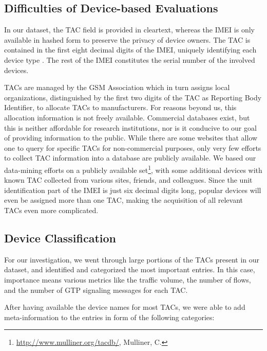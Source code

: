 \subsection{Difficulties of Device-based Evaluations}

In our dataset, the \ac{TAC} field is provided in clear\-text, whereas the \ac{IMEI} is only available in hashed form to preserve the privacy of device owners. The \ac{TAC} is contained in the first eight decimal digits of the \ac{IMEI}, uniquely identifying each device type \cite{3gpp23.003}. The rest of the \ac{IMEI} constitutes the serial number of the involved devices.

\acp{TAC} are managed by the GSM Association which in turn assigns local organizations, distinguished by the first two digits of the \ac{TAC} as Reporting Body Identifier, to allocate \acp{TAC} to manufacturers. For reasons beyond us, this allocation information is not freely available. Commercial databases exist, but this is neither affordable for research institutions, nor is it conducive to our goal of providing information to the public. While there are some websites that allow one to query for specific \acp{TAC} for non-commercial purposes, only very few efforts to collect \ac{TAC} information into a database are publicly available. We based our data-mining efforts on a publicly available set\footnote{\url{http://www.mulliner.org/tacdb/}, Mulliner, C.}, with some additional devices with known \ac{TAC} collected from various sites, friends, and colleagues. Since the unit identification part of the \ac{IMEI} is just six decimal digits long, popular devices will even be assigned more than one TAC, making the acquisition of all relevant \acp{TAC} even more complicated.



\subsection{Device Classification}

For our investigation, we went through large portions of the \acp{TAC} present in our dataset, and identified and categorized the most important entries. In this case, importance means various metrics like the traffic volume, the number of flows, and the number of \ac{GTP} signaling messages for each \ac{TAC}. 

After having available the device names for most \acp{TAC}, we were able to add meta-information to the entries in form of the following categories:


